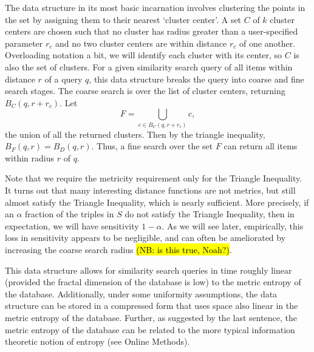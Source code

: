 \documentclass[review,preprint,12pt]{elsarticle}
\theoremstyle{definition}
\theoremstyle{remark}
\numberwithin{equation}{section}
\begin{document}
The data structure in its most basic incarnation involves clustering the points in the set by assigning them to their nearest `cluster center'.
A set $C$ of $k$ cluster centers are chosen such that no cluster has radius greater than a user-specified parameter $r_c$ and no two cluster centers are within distance $r_c$ of one another.
Overloading notation a bit, we will identify each cluster with its center, so $C$ is also the set of clusters.
For a given similarity search query of all items within distance $r$ of a query $q$, this data structure breaks the query into coarse and fine search stages.
The coarse search is over the list of cluster centers, returning $B_C(q,r + r_c)$.
Let \[\displaystyle F = \bigcup_{c \in B_C(q,r+r_c)} c , \] the union of all the returned clusters.
Then by the triangle inequality, $B_F(q,r) = B_D(q,r)$.
Thus, a fine search over the set $F$ can return all items within radius $r$ of $q$.

Note that we require the metricity requirement only for the Triangle Inequality.
It turns out that many interesting distance functions are not metrics, but still almost satisfy the Triangle Inequality, which is nearly sufficient.
More precisely, if an $\alpha$ fraction of the triples in $S$ do not satisfy the Triangle Inequality, then in expectation, we will have sensitivity $1 - \alpha$.
As we will see later, empirically, this loss in sensitivity appears to be negligible, and can often be ameliorated by increasing the coarse search radius \hl{(NB: is this true, Noah?)}.

This data structure allows for similarity search queries in time roughly linear (provided the fractal dimension of the database is low) to the metric entropy of the database.
Additionally, under some uniformity assumptions, the data structure can be stored in a compressed form that uses space also linear in the metric entropy of the database.
Further, as suggested by the last sentence, the metric entropy of the database can be related to the more typical information theoretic notion of entropy (see Online Methods).
\end{document}
